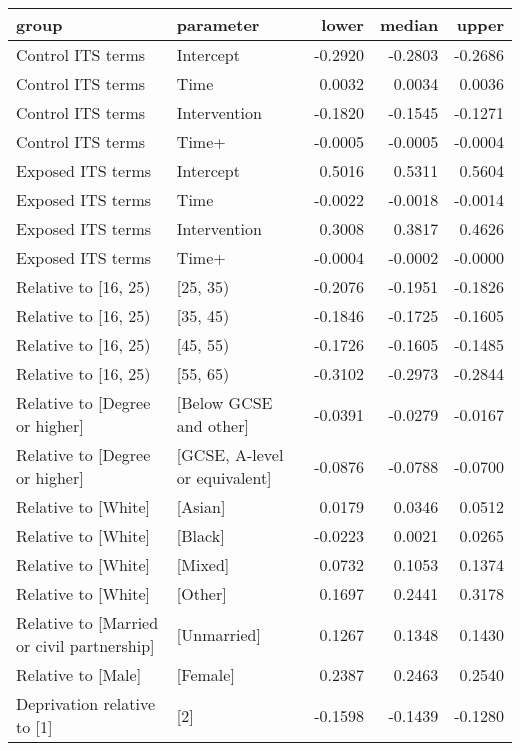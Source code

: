 \begin{table}[ht]
\centering
\begin{tabular}{llrrr}
  \hline
group & parameter & lower & median & upper \\ 
  \hline
Control ITS terms & Intercept & -0.2920 & -0.2803 & -0.2686 \\ 
  Control ITS terms & Time & 0.0032 & 0.0034 & 0.0036 \\ 
  Control ITS terms & Intervention & -0.1820 & -0.1545 & -0.1271 \\ 
  Control ITS terms & Time+ & -0.0005 & -0.0005 & -0.0004 \\ 
  Exposed ITS terms & Intercept & 0.5016 & 0.5311 & 0.5604 \\ 
  Exposed ITS terms & Time & -0.0022 & -0.0018 & -0.0014 \\ 
  Exposed ITS terms & Intervention & 0.3008 & 0.3817 & 0.4626 \\ 
  Exposed ITS terms & Time+ & -0.0004 & -0.0002 & -0.0000 \\ 
  Relative to [16, 25) & [25, 35) & -0.2076 & -0.1951 & -0.1826 \\ 
  Relative to [16, 25) & [35, 45) & -0.1846 & -0.1725 & -0.1605 \\ 
  Relative to [16, 25) & [45, 55) & -0.1726 & -0.1605 & -0.1485 \\ 
  Relative to [16, 25) & [55, 65) & -0.3102 & -0.2973 & -0.2844 \\ 
  Relative to [Degree or higher] & [Below GCSE and other] & -0.0391 & -0.0279 & -0.0167 \\ 
  Relative to [Degree or higher] & [GCSE, A-level or equivalent] & -0.0876 & -0.0788 & -0.0700 \\ 
  Relative to [White] & [Asian] & 0.0179 & 0.0346 & 0.0512 \\ 
  Relative to [White] & [Black] & -0.0223 & 0.0021 & 0.0265 \\ 
  Relative to [White] & [Mixed] & 0.0732 & 0.1053 & 0.1374 \\ 
  Relative to [White] & [Other] & 0.1697 & 0.2441 & 0.3178 \\ 
  Relative to [Married or civil partnership] & [Unmarried] & 0.1267 & 0.1348 & 0.1430 \\ 
  Relative to [Male] & [Female] & 0.2387 & 0.2463 & 0.2540 \\ 
  Deprivation relative to [1] & [2] & -0.1598 & -0.1439 & -0.1280 \\ 

\end{tabular}
\end{table}
